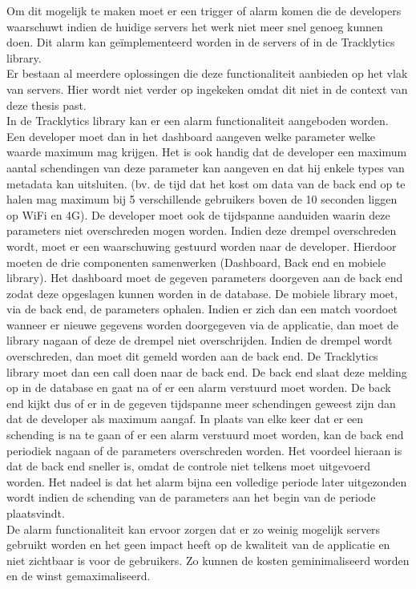 Om dit mogelijk te maken moet er een trigger of alarm komen die de developers waarschuwt indien de huidige servers het werk niet meer snel genoeg kunnen doen. Dit alarm kan ge\"implementeerd worden in de servers of in de Tracklytics library. \\

Er bestaan al meerdere oplossingen die deze functionaliteit aanbieden op het vlak van servers. Hier wordt niet verder op ingekeken omdat dit niet in de context van deze thesis past. \\

In de Tracklytics library kan er een alarm functionaliteit aangeboden worden. Een developer moet dan in het dashboard aangeven welke parameter welke waarde maximum mag krijgen. Het is ook handig dat de developer een maximum aantal schendingen van deze parameter kan aangeven en dat hij enkele types van metadata kan uitsluiten. (bv. de tijd dat het kost om data van de back end op te halen mag maximum bij 5 verschillende gebruikers boven de 10 seconden liggen op WiFi en 4G). De developer moet ook de tijdspanne aanduiden waarin deze parameters niet overschreden mogen worden. Indien deze drempel overschreden wordt, moet er een waarschuwing gestuurd worden naar de developer. Hierdoor moeten de drie componenten samenwerken (Dashboard, Back end en mobiele library). Het dashboard moet de gegeven parameters doorgeven aan de back end zodat deze opgeslagen kunnen worden in de database. De mobiele library moet, via de back end, de parameters ophalen. Indien er zich dan een match voordoet wanneer er nieuwe gegevens worden doorgegeven via de applicatie, dan moet de library nagaan of deze de drempel niet overschrijden. Indien de drempel wordt overschreden, dan moet dit gemeld worden aan de back end. De Tracklytics library moet dan een call doen naar de back end. De back end slaat deze melding op in de database en gaat na of er een alarm verstuurd moet worden. De back end kijkt dus of er in de gegeven tijdspanne meer schendingen geweest zijn dan dat de developer als maximum aangaf. In plaats van elke keer dat er een schending is na te gaan of er een alarm verstuurd moet worden, kan de back end periodiek nagaan of de parameters overschreden worden. Het voordeel hieraan is dat de back end sneller is, omdat de controle niet telkens moet uitgevoerd worden. Het nadeel is dat het alarm bijna een volledige periode later uitgezonden wordt indien de schending van de parameters aan het begin van de periode plaatsvindt. \\

De alarm functionaliteit kan ervoor zorgen dat er zo weinig mogelijk servers gebruikt worden en het geen impact heeft op de kwaliteit van de applicatie en niet zichtbaar is voor de gebruikers. Zo kunnen de kosten geminimaliseerd worden en de winst gemaximaliseerd. 